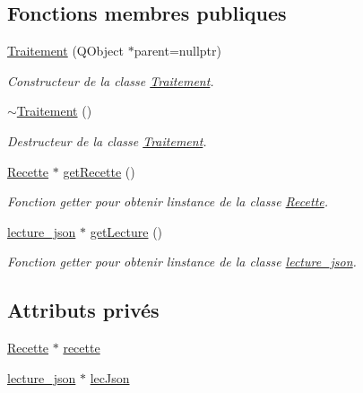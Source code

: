 \subsection*{Fonctions membres publiques}
\begin{DoxyCompactItemize}
\item 
\hyperlink{classTraitement_a36edd9e6ce6e72cfef7f9c857c3c9cf2}{Traitement} (Q\+Object $\ast$parent=nullptr)
\begin{DoxyCompactList}\small\item\em Constructeur de la classe \hyperlink{classTraitement}{Traitement}. \end{DoxyCompactList}\item 
\hyperlink{classTraitement_a7dd82f97c992d07b7032184f12c7fab9}{$\sim$\+Traitement} ()
\begin{DoxyCompactList}\small\item\em Destructeur de la classe \hyperlink{classTraitement}{Traitement}. \end{DoxyCompactList}\item 
\hyperlink{classRecette}{Recette} $\ast$ \hyperlink{classTraitement_a587f76ba51e61307815c9e279821a744}{get\+Recette} ()
\begin{DoxyCompactList}\small\item\em Fonction getter pour obtenir l\textquotesingle{}instance de la classe \hyperlink{classRecette}{Recette}. \end{DoxyCompactList}\item 
\hyperlink{classlecture__json}{lecture\+\_\+json} $\ast$ \hyperlink{classTraitement_a91ecaaa93bbdc283a3eebe3c060e656d}{get\+Lecture} ()
\begin{DoxyCompactList}\small\item\em Fonction getter pour obtenir l\textquotesingle{}instance de la classe \hyperlink{classlecture__json}{lecture\+\_\+json}. \end{DoxyCompactList}\end{DoxyCompactItemize}
\subsection*{Attributs privés}
\begin{DoxyCompactItemize}
\item 
\hyperlink{classRecette}{Recette} $\ast$ \hyperlink{classTraitement_afc8ac78bded6d17a86323544aa00d91b}{recette}
\item 
\hyperlink{classlecture__json}{lecture\+\_\+json} $\ast$ \hyperlink{classTraitement_ac7e6ff3bfc54975b1c8831a2ad8fc9a4}{lec\+Json}
\end{DoxyCompactItemize}



